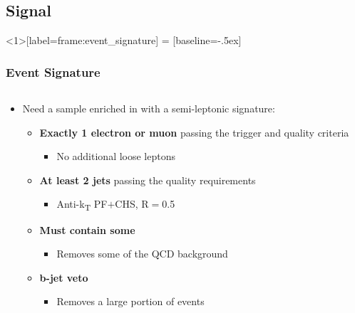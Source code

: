 

\subsection*{Signal}


\begin{frame}<1>[label=frame:event_signature]
	 = [baseline=-.5ex]
	\frametitle{Event Signature}
	\vspace*{-0.24cm}
	\begin{columns}[T]
		\begin{column}{0.5\textwidth}
			\begin{block}{}
				\begin{itemize}
					\item Need a sample enriched in \HWW with a semi-leptonic signature:
					\begin{itemize}
						\item<2-> \textbf{Exactly 1 electron or muon}{} passing the trigger and quality criteria
						\begin{itemize}
							\item<2-> No additional loose leptons
						\end{itemize}
						\item<3-> \textbf{At least 2 jets} passing the quality{} requirements
						\begin{itemize}
							\item<3-> Anti-k\textsubscript{T} PF$+$CHS, R$=$0.5
						\end{itemize}
						\item<4-> \textbf{Must contain some \ETslash}{}
						\begin{itemize}
							\item<4-> Removes some of the QCD background
						\end{itemize}
						\item<5-> \textbf{b-jet veto}{}
						\begin{itemize}
							\item Removes a large portion of \ttbar events

\end{itemize}
\end{itemize}
\end{itemize}
\end{block}
\end{column}
\end{columns}
\end{frame}
